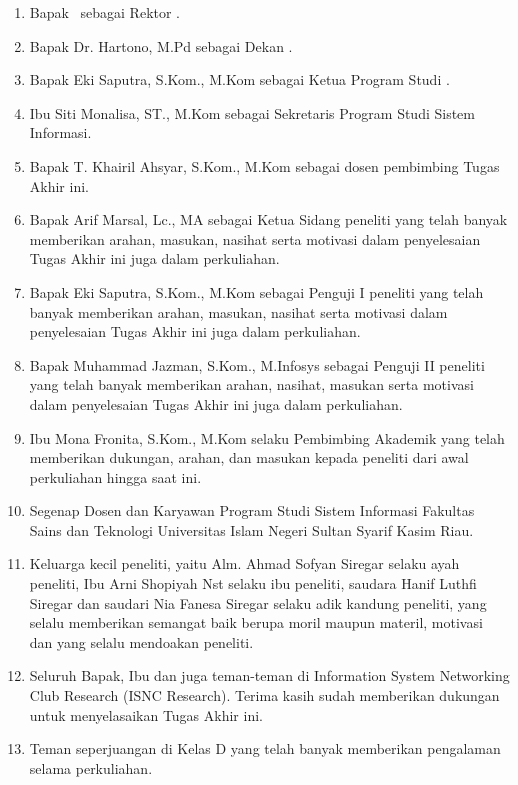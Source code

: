 \begin{enumerate}
	\item Bapak \rektor\  sebagai Rektor \universitas.
	\item Bapak Dr. Hartono, M.Pd sebagai Dekan \fakultas.
	\item Bapak Eki Saputra, S.Kom., M.Kom sebagai Ketua Program Studi \programStudi.
	\item Ibu Siti Monalisa, ST., M.Kom sebagai Sekretaris Program Studi Sistem Informasi.
	\item Bapak T. Khairil Ahsyar, S.Kom., M.Kom sebagai dosen pembimbing Tugas Akhir ini.
	\item Bapak Arif Marsal, Lc., MA sebagai Ketua Sidang peneliti yang telah banyak memberikan arahan, masukan, nasihat serta motivasi dalam penyelesaian Tugas Akhir ini juga dalam perkuliahan.
	\item Bapak Eki Saputra, S.Kom., M.Kom sebagai Penguji I peneliti yang telah banyak memberikan arahan, masukan, nasihat serta motivasi dalam penyelesaian Tugas Akhir ini juga dalam perkuliahan.
	\item Bapak Muhammad Jazman, S.Kom., M.Infosys sebagai Penguji II peneliti yang telah banyak memberikan arahan, nasihat, masukan serta motivasi dalam penyelesaian Tugas Akhir ini juga dalam perkuliahan.
	\item Ibu Mona Fronita, S.Kom., M.Kom selaku Pembimbing Akademik yang telah memberikan dukungan, arahan, dan masukan kepada peneliti dari awal perkuliahan hingga saat ini.
	\item Segenap Dosen dan Karyawan Program Studi Sistem Informasi Fakultas Sains dan Teknologi Universitas Islam Negeri Sultan Syarif Kasim Riau.
	\item Keluarga kecil peneliti, yaitu Alm. Ahmad Sofyan Siregar selaku ayah peneliti, Ibu Arni Shopiyah Nst selaku ibu peneliti, saudara Hanif Luthfi Siregar dan saudari Nia Fanesa Siregar selaku adik kandung peneliti, yang selalu memberikan semangat baik berupa moril maupun materil, motivasi dan yang selalu mendoakan peneliti.
	\item Seluruh Bapak, Ibu dan juga teman-teman di Information System Networking Club Research (ISNC Research). Terima kasih sudah memberikan dukungan untuk menyelasaikan Tugas Akhir ini.
	\item Teman seperjuangan di Kelas D yang telah banyak memberikan pengalaman selama perkuliahan.

\end{enumerate}
